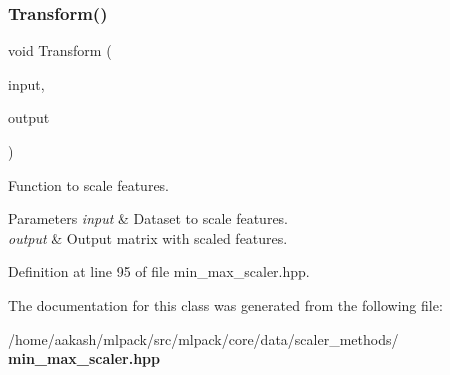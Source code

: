 \subsubsection{Transform()}
{\footnotesize\ttfamily void Transform (\begin{DoxyParamCaption}\item[{const Mat\+Type \&}]{input,  }\item[{Mat\+Type \&}]{output }\end{DoxyParamCaption})\hspace{0.3cm}{\ttfamily [inline]}}



Function to scale features. 


\begin{DoxyParams}{Parameters}
{\em input} & Dataset to scale features. \\
\hline
{\em output} & Output matrix with scaled features. \\
\hline
\end{DoxyParams}


Definition at line 95 of file min\+\_\+max\+\_\+scaler.\+hpp.



The documentation for this class was generated from the following file\+:\begin{DoxyCompactItemize}
\item 
/home/aakash/mlpack/src/mlpack/core/data/scaler\+\_\+methods/\textbf{ min\+\_\+max\+\_\+scaler.\+hpp}\end{DoxyCompactItemize}
